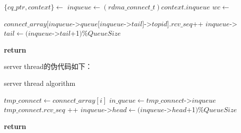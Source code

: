 {\begin{algorithm}
\begin{algorithmic}[1]
                \State $\{ cq\_ptr, context\} \gets$  
                \State $inqueue \gets (rdma\_connect\_t)context.inqueue$
                \State {}
                \State $wc \gets$ 

                \State
                    \State {}
                \Else
                    \State {} 
                    \State {}

                    \State
                    \State $connect\_array[inqueue$->$queue[inqueue$->$tail]$->$topid].rcv\_seq $++
                    \State $inqueue$->$tail \gets (inqueue$->$tail$+1$) \% QueueSize$
                \EndIf
            \EndWhile
            
            \State
            \State {}
            \State \textbf{return}
        \EndFunction
    \end{algorithmic}
\end{algorithm}

\newpage
server thread的伪代码如下：
\begin{algorithm}
    \caption{server thread algorithm}
    \begin{algorithmic}[1] %
            \State {}

                    \State $tmp\_connect \gets connect\_array[i]$
                    \State $in\_queue \gets tmp\_connect$->$inqueue$
                        \State {}
                        \State {} 
                        \State {}
                            \State $tmp\_connect.rcv\_seq$ ++
                        \EndIf
                        \State $inqueue$->$head \gets (inqueue$->$head$+1$) \% QueueSize$
                    \EndIf
                \EndFor

                    \State {}
                \EndIf
            \EndWhile
            \State \textbf{return}
         \EndProcedure
    \end{algorithmic}
\end{algorithm}

}
